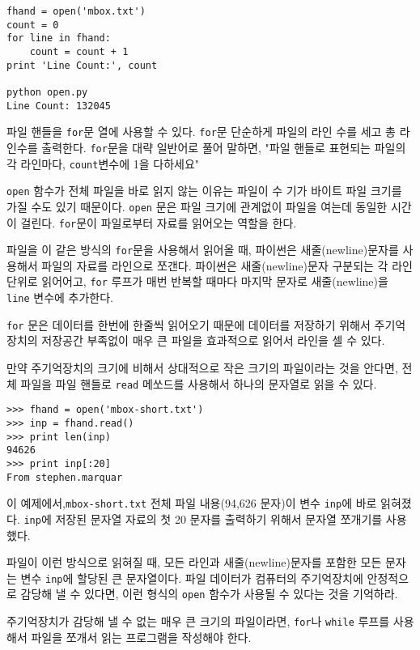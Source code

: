 \beforeverb
\begin{verbatim}
fhand = open('mbox.txt')
count = 0
for line in fhand:
    count = count + 1
print 'Line Count:', count

python open.py 
Line Count: 132045
\end{verbatim}
\afterverb
%

파일 핸들을 {\tt for}문 열에 사용할 수 있다. {\tt for}문 단순하게 파일의 라인 수를 세고 총 라인수를 출력한다.
{\tt for}문을 대략 일반어로 풀어 말하면, "파일 핸들로 표현되는 파일의 각 라인마다, {\tt count}변수에 1을 다하세요"

{\tt open} 함수가 전체 파일을 바로 읽지 않는 이유는 파일이 수 기가 바이트 파일 크기를 가질 수도 있기 때문이다.
{\tt open} 문은 파일 크기에 관계없이 파일을 여는데 동일한 시간이 걸린다. {\tt for}문이 파일로부터 자료를 읽어오는 역할을 한다.

파일을 이 같은 방식의 {\tt for}문을 사용해서 읽어올 때, 파이썬은 새줄(newline)문자를 사용해서 파일의 자료를 라인으로 쪼갠다.
파이썬은 새줄(newline)문자 구분되는 각 라인 단위로 읽어어고, {\tt for} 루프가 매번 반복할 때마다 마지막 문자로 새줄(newline)을 {\tt line} 변수에 추가한다.

{\tt for} 문은 데이터를 한번에 한줄씩 읽어오기 때문에 데이터를 저장하기 위해서 주기억장치의 저장공간 부족없이 매우 큰 파일을 효과적으로 읽어서 라인을 셀 수 있다.

만약 주기억장치의 크기에 비해서 상대적으로 작은 크기의 파일이라는 것을 안다면, 전체 파일을 파일 핸들로 {\tt read} 메쏘드를 사용해서 하나의 문자열로 읽을 수 있다.

\beforeverb
\begin{verbatim}
>>> fhand = open('mbox-short.txt')
>>> inp = fhand.read()
>>> print len(inp)
94626
>>> print inp[:20]
From stephen.marquar
\end{verbatim}
\afterverb
%

이 예제에서,{\tt mbox-short.txt} 전체 파일 내용(94,626 문자)이 변수 {\tt inp}에 바로 읽혀졌다.
{\tt inp}에 저장된 문자열 자료의 첫 20 문자를 출력하기 위해서 문자열 쪼개기를 사용했다.

파일이 이런 방식으로 읽혀질 때, 모든 라인과 새줄(newline)문자를 포함한 모든 문자는 변수 {\tt inp}에 할당된 큰 문자열이다.
파일 데이터가 컴퓨터의 주기억장치에 안정적으로 감당해 낼 수 있다면, 이런 형식의 {\tt open} 함수가 사용될 수 있다는 것을 기억하라.

주기억장치가 감당해 낼 수 없는 매우 큰 크기의 파일이라면, {\tt for}나 {\tt while} 루프를 사용해서 파일을 쪼개서 읽는 프로그램을 작성해야 한다.

